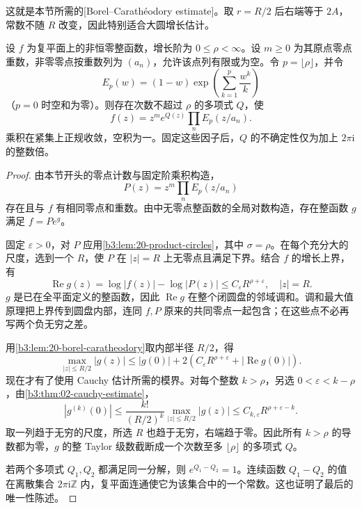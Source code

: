 这就是本节所需的[Borel--Carathéodory estimate]。取 \(r=R/2\) 后右端等于 \(2A\)，常数不随 \(R\) 改变，因此特别适合大圆增长估计。

\begin{theorem}[Hadamard 分解]\label{b3:thm:20-hadamard}
设 \(f\) 为复平面上的非恒零整函数，增长阶为 \(0\le\rho<\infty\)。设 \(m\ge0\) 为其原点零点重数，非零零点按重数列为 \((a_n)\)，允许该点列有限或为空。令 \(p=\lfloor\rho\rfloor\)，并令
\[
 E_p(w)=(1-w)\exp\left(\sum_{k=1}^p\frac{w^k}{k}\right)
\]
（\(p=0\) 时空和为零）。则存在次数不超过 \(\rho\) 的多项式 \(Q\)，使
\begin{equation}\label{b3:eq:20-hadamard-factorization}
 f(z)=z^m e^{Q(z)}\prod_nE_p(z/a_n).
\end{equation}
乘积在紧集上正规收敛，空积为一。固定这些因子后，\(Q\) 的不确定性仅为加上 \(2\pi\mathrm{i}\) 的整数倍。
\end{theorem}
\begin{proof}
由本节开头的零点计数与固定阶乘积构造，
\[
 P(z)=z^m\prod_nE_p(z/a_n)
\]
存在且与 \(f\) 有相同零点和重数。由中无零点整函数的全局对数构造，存在整函数 \(g\) 满足 \(f=Pe^g\)。

固定 \(\varepsilon>0\)，对 \(P\) 应用\cref{b3:lem:20-product-circles}，其中 \(\sigma=\rho\)。在每个充分大的尺度，选到一个 \(R\)，使 \(P\) 在 \(|z|=R\) 上无零点且满足下界。结合 \(f\) 的增长上界，有
\[
 \operatorname{Re}g(z)
 =\log|f(z)|-\log|P(z)|
 \le C_\varepsilon R^{\rho+\varepsilon},\quad |z|=R.
\]
\(g\) 是已在全平面定义的整函数，因此 \(\operatorname{Re}g\) 在整个闭圆盘的邻域调和。调和最大值原理把上界传到圆盘内部，连同 \(f,P\) 原来的共同零点一起包含；在这些点不必再写两个负无穷之差。

用\cref{b3:lem:20-borel-caratheodory}取内部半径 \(R/2\)，得
\[
 \max_{|z|\le R/2}|g(z)|
 \le |g(0)|+2\left(C_\varepsilon R^{\rho+\varepsilon}
                         +|\operatorname{Re}g(0)|\right).
\]
现在才有了使用 Cauchy 估计所需的模界。对每个整数 \(k>\rho\)，另选 \(0<\varepsilon<k-\rho\)，由\cref{b3:thm:02-cauchy-estimate}，
\[
 |g^{(k)}(0)|\le
 \frac{k!}{(R/2)^k}\max_{|z|\le R/2}|g(z)|
 \le C_{k,\varepsilon}R^{\rho+\varepsilon-k}.
\]
取一列趋于无穷的尺度，所选 \(R\) 也趋于无穷，右端趋于零。因此所有 \(k>\rho\) 的导数都为零，\(g\) 的整 Taylor 级数截断成一个次数至多 \(\lfloor\rho\rfloor\) 的多项式 \(Q\)。

若两个多项式 \(Q_1,Q_2\) 都满足同一分解，则 \(e^{Q_1-Q_2}=1\)。连续函数 \(Q_1-Q_2\) 的值在离散集合 \(2\pi\mathrm{i}\mathbb Z\) 内，复平面连通使它为该集合中的一个常数。这也证明了最后的唯一性陈述。
\end{proof}


